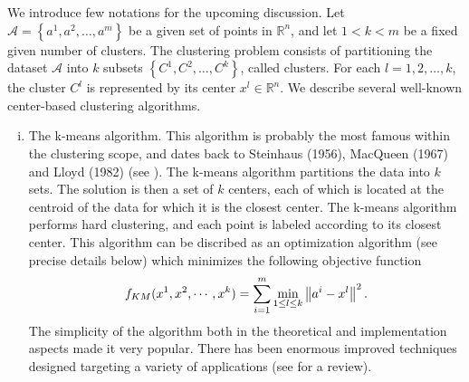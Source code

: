 We introduce few notations for the upcoming discussion. Let $\mathcal{A}= \left\lbrace a^1, a^2, \ldots ,a^m \right\rbrace$ be a given set of points in $\mathbb{R}^n$, and let $1 < k < m$ be a fixed given number of clusters. The clustering problem consists of partitioning the dataset $\mathcal{A}$ into $k$ subsets $\left\lbrace C^1, C^2, \ldots ,C^k \right\rbrace$, called clusters. For each $l=1, 2, \ldots ,k$, the cluster $C^l$ is represented by its center $x^l \in \mathbb{R}^n$. We describe several well-known center-based clustering algorithms.
\begin{enumerate}[(i)]
	\item The k-means algorithm. This algorithm is probably the most famous within the clustering scope, and dates back to Steinhaus (1956), MacQueen (1967) and Lloyd (1982) (see \cite{S1956,M1967,L1982}). The k-means algorithm partitions the data into $k$ sets. The solution is then a set of $k$ centers, each of which is located at the centroid of the data for which it is the closest center. The k-means algorithm performs hard clustering, and each point is labeled according to its closest center. This algorithm can be discribed as an optimization algorithm (see precise details below) which minimizes the following objective function
	\begin{equation*}
		f_{KM}(x^1,x^2,\cdots,x^k) = \sum\limits_{i=1}^{m}\min\limits_{1 \le l \le k} \left\Vert {a^i-x^l} \right\Vert^2.
	\end{equation*}
	The simplicity of the algorithm both in the theoretical and implementation aspects made it very popular. There has been enormous improved techniques designed targeting a variety of applications (see \cite{JMF1999} for a review).
	

\end{enumerate}
